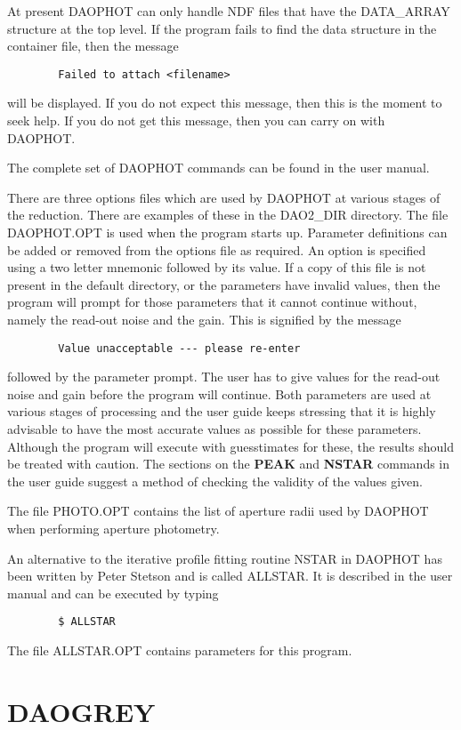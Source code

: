 At present DAOPHOT can only handle NDF files that have the DATA\_ARRAY
structure at the top level. If the program fails to find the data structure in
the container file, then the message
\begin{verbatim}
        Failed to attach <filename>
\end{verbatim}
will be displayed. If you do not expect this message, then this is the moment
to seek help. If you do not get this message, then you can carry on with
DAOPHOT.

The complete set of DAOPHOT commands can be found in the user manual.

There are three options files which are used by DAOPHOT at various stages of
the reduction. There are examples of these in the DAO2\_DIR directory. The file
DAOPHOT.OPT is used when the program starts up. Parameter definitions can be
added or removed from the options file as required. An option is specified
using a two letter mnemonic followed by its value. If a copy of this file is
not present in the default directory, or the parameters have invalid values,
then the program will prompt for those parameters that it cannot continue
without, namely the  read-out noise and the gain. This is signified by the
message
\begin{verbatim}
        Value unacceptable --- please re-enter
\end{verbatim}
followed by the parameter prompt. The user has to give values for the read-out
noise and gain before the program will continue. Both parameters are used at
various stages of processing and the user guide keeps stressing that it is
highly advisable to have the most accurate values as possible for these
parameters. Although the program will execute with guesstimates for these, the
results should be treated with caution. The sections on the {\bf PEAK} and {\bf
NSTAR} commands in the user guide suggest a method of checking the validity of
the values given.

The file PHOTO.OPT contains the list of aperture radii used by DAOPHOT when
performing aperture photometry.

An alternative to the iterative profile fitting routine NSTAR in DAOPHOT has
been written by Peter Stetson and is called ALLSTAR. It is described in the
user manual and can be executed by typing
\begin{verbatim}
        $ ALLSTAR
\end{verbatim}
The file ALLSTAR.OPT contains parameters for this program.
\section{DAOGREY}

